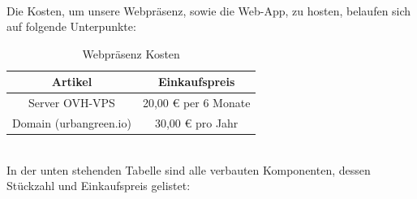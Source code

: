 \mbox{} \\
Die Kosten, um unsere Webpräsenz, sowie die Web-App, zu hosten, belaufen sich auf folgende Unterpunkte:
\mbox{} \\

\begin{table}[ht]
{\centering
\begin{tabular}{|c|c|}
\hline
\textbf{Artikel}       & \textbf{Einkaufspreis} \\ \hline
Server OVH-VPS         & 20,00 € per 6 Monate   \\ \hline
Domain (urbangreen.io) & 30,00 € pro Jahr       \\ \hline
\end{tabular}
\caption{Webpräsenz Kosten}}
\end{table} \mbox{} \\
In der unten stehenden Tabelle sind alle verbauten Komponenten, dessen Stückzahl und Einkaufspreis gelistet:\\

